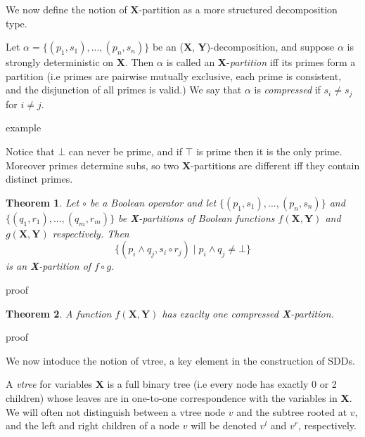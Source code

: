 \documentclass{article}
\newtheorem{theorem}{Theorem}[section]
\newenvironment{proof}[1][Proof]{\begin{trivlist}
\item[\hskip \labelsep {\bfseries #1}]}{\end{trivlist}}
\newenvironment{definition}[1][Definition]{\begin{trivlist}
\item[\hskip \labelsep {\bfseries #1}]}{\end{trivlist}}
\newenvironment{example}[1][Example]{\begin{trivlist}
\item[\hskip \labelsep {\bfseries #1}]}{\end{trivlist}}
\newenvironment{remark}[1][Remark]{\begin{trivlist}
\item[\hskip \labelsep {\bfseries #1}]}{\end{trivlist}}
\begin{document}
We now define the notion of \textbf{X}-partition as a more structured decomposition type. 
\begin{definition}
Let $\alpha = \{(p_1, s_1),...,(p_n, s_n)\}$ be an (\textbf{X}, \textbf{Y})-decomposition, and suppose $\alpha$ is strongly deterministic on \textbf{X}.
Then $\alpha$ is called an \textbf{X}-\textit{partition} iff its primes form a partition (i.e primes are pairwise mutually exclusive, each prime is consistent, and the disjunction of all primes is valid.)
We say that $\alpha$ is \textit{compressed} if $s_i \neq s_j$ for $i \neq j$.
\end{definition}

\begin{example} 
example
\end{example}

\begin{remark} Notice that $\bot$ can never be prime, and if $\top$ is prime then it is the only prime. Moreover primes determine subs, so two \textbf{X}-partitions are different iff they contain distinct primes.
\end{remark}

\begin{theorem}
Let $\circ$ be a Boolean operator and let $\{(p_1, s_1),...,(p_n, s_n)\}$ and $\{(q_1, r_1),...,(q_m, r_m)\}$  be \textbf{X}-partitions of Boolean functions $f(\textbf{X}, \textbf{Y})$ and $g(\textbf{X}, \textbf{Y})$ respectively. Then $$\{(p_i \land q_j, s_i \circ r_j) \mid  p_i \land q_j  \neq \bot \}$$ is an \textbf{X}-partition of $f \circ g$.
\end{theorem}
\begin{proof}
 proof
\end{proof}


\begin{theorem}
A function $f(\textbf{X}, \textbf{Y})$ has exaclty one compressed \textbf{X}-partition.
\end{theorem}
\begin{proof}
proof
\end{proof}

We now intoduce the notion of vtree, a key element in the construction of SDDs.

\begin{definition}
A \textit{vtree} for variables \textbf{X} is a full binary tree (i.e every node has exactly 0 or 2 children) whose leaves are in one-to-one correspondence with the variables in \textbf{X}. We will often not distinguish between a vtree node $v$ and the subtree rooted at $v$, and the left and right children of a node $v$ will be denoted $v^l$ and $v^r$, respectively.
\end{definition}
\end{document}
